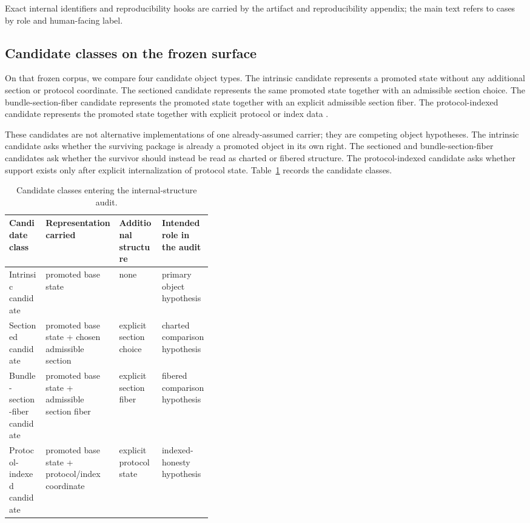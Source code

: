 \documentclass[11pt]{article}
\theoremstyle{definition}
\begin{document}
Exact internal identifiers and reproducibility hooks are carried by the artifact and reproducibility appendix; the main text refers to cases by role and human-facing label.

\subsection{Candidate classes on the frozen surface}

On that frozen corpus, we compare four candidate object types. The intrinsic candidate represents a promoted state without any additional section or protocol coordinate. The sectioned candidate represents the same promoted state together with an admissible section choice. The bundle-section-fiber candidate represents the promoted state together with an explicit admissible section fiber. The protocol-indexed candidate represents the promoted state together with explicit protocol or index data \cite{Tsiokos2026PromotionCriteria}.

These candidates are not alternative implementations of one already-assumed carrier; they are competing object hypotheses. The intrinsic candidate asks whether the surviving package is already a promoted object in its own right. The sectioned and bundle-section-fiber candidates ask whether the survivor should instead be read as charted or fibered structure. The protocol-indexed candidate asks whether support exists only after explicit internalization of protocol state. Table~\ref{tab:candidate-classes} records the candidate classes.

\begin{table}[t]
\centering
\caption{Candidate classes entering the internal-structure audit.}
\label{tab:candidate-classes}
\small
\begin{tabularx}{\linewidth}{@{}>{\raggedright\arraybackslash}p{0.18\linewidth}>{\raggedright\arraybackslash}X>{\raggedright\arraybackslash}p{0.21\linewidth}>{\raggedright\arraybackslash}X@{}}
\toprule
Candidate class & Representation carried & Additional structure & Intended role in the audit \\
\midrule
Intrinsic candidate & promoted base state & none & primary object hypothesis \\
Sectioned candidate & promoted base state + chosen admissible section & explicit section choice & charted comparison hypothesis \\
Bundle-section-fiber candidate & promoted base state + admissible section fiber & explicit section fiber & fibered comparison hypothesis \\
Protocol-indexed candidate & promoted base state + protocol/index coordinate & explicit protocol state & indexed-honesty hypothesis \\
\bottomrule
\end{tabularx}
\end{table}
\end{document}
